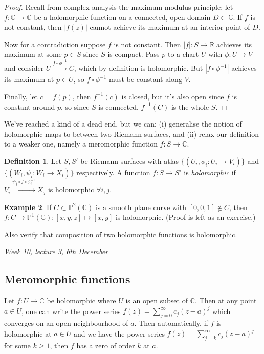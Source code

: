\documentclass{article}
\newcommand{\R}{\mathbb{R}}
\newcommand{\C}{\mathbb{C}}
\newcommand{\p}{\mathbb{P}}
\theoremstyle{definition}
\newtheorem{defn}{Definition}[subsection]
\newtheorem{example}[defn]{Example}
\begin{document}
\begin{proof}
Recall from complex analysis the maximum modulus principle: let $f:\C\rightarrow\C$ be a holomorphic function on a connected, open domain $D\subset\C$. If $f$ is not constant, then $|f(z)|$ cannot achieve its maximum at an interior point of $D$.

Now for a contradiction suppose $f$ is not constant. Then $|f|:S\rightarrow\R$ achieves its maximum at some $p\in S$ since $S$ is compact. Pass $p$ to a chart $U$ with $\phi:U\rightarrow V$ and consider $U\xrightarrow{f\circ\phi^{-1}}C$, which by definition is holomorphic. But $|f\circ\phi^{-1}|$ achieves its maximum at $p\in U$, so $f\circ\phi^{-1}$ must be constant along $V$.

Finally, let $c=f(p)$, then $f^{-1}(c)$ is closed, but it's also open since $f$ is constant around $p$, so since $S$ is connected, $f^{-1}(C)$ is the whole $S$.
\end{proof}

We've reached a kind of a dead end, but we can: (i) generalise the notion of holomorphic maps to between two Riemann surfaces, and (ii) relax our definition to a weaker one, namely a meromorphic function $f:S\rightarrow\C$.

\begin{defn}
Let $S,S'$ be Riemann surfaces with atlas $\{(U_i,\phi_i:U_i\rightarrow V_i)\}$ and $\{(W_i,\psi_i:W_i\rightarrow X_i)\}$ respectively. A function $f:S\rightarrow S'$ is \textit{holomorphic} if $V_i\xrightarrow{\psi_j\circ f\circ\phi_i^{-1}}X_j$ is holomorphic $\forall i,j$.
\end{defn}

\begin{example}
If $C\subset\p^2(\C)$ is a smooth plane curve with $[0,0,1]\notin C$, then $f:C\rightarrow\p^1(\C):[x,y,z]\mapsto[x,y]$ is holomorphic. (Proof is left as an exercise.)

Also verify that composition of two holomorphic functions is holomorphic.
\end{example}

\begin{flushright}
\textit{Week 10, lecture 3, 6th December}
\end{flushright}

\subsection{Meromorphic functions}
Let $f:U\rightarrow\C$ be holomorphic where $U$ is an open subset of $\C$. Then at any point $a\in U$, one can write the power series $f(z)=\sum_{j=0}^\infty c_j(z-a)^j$ which converges on an open neighbourhood of $a$. Then automatically, if $f$ is holomorphic at $a\in U$ and we have the power series $f(z)=\sum_{j=k}^\infty c_j(z-a)^j$ for some $k\geq 1$, then $f$ has a zero of order $k$ at $a$.
\end{document}
